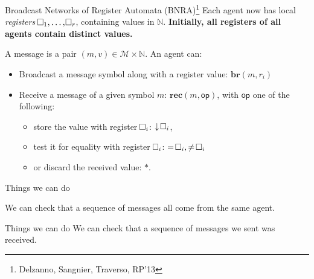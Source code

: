 \documentclass{beamer}
\newcommand{\messages}{\mathcal{M}}
\newcommand{\reg}{\hspace{-0.5mm}\square}
\begin{document}
\begin{frame}{Broadcast Networks of Register Automata (BNRA)\footnote{Delzanno, Sangnier, Traverso, RP'13}}
	Each agent now has local \emph{registers} $\reg_1, \ldots, \reg_r$, containing values in $\mathbb{N}$.
	\pause
	\textbf{Initially, all registers of all agents contain distinct values.}
	
	\pause
	\vspace{0.2cm}
	A message is a pair $(m, v) \in \messages \times \mathbb{N}$.
	An agent can:
	\begin{itemize}
		\item Broadcast a message symbol along with a register value: $\mathbf{br}(m, r_i)$\vspace{0.3cm}\pause
		
		
		\item Receive a message of a given symbol $m$: $\mathbf{rec}(m, \mathsf{op})$, with $\mathsf{op}$ one of the following:
		\begin{itemize}
			\item store the value with register $\reg_i$: $\downarrow \reg_i$,
			
			\item test it for equality with register $\reg_i$: $= \reg_i, \neq \reg_i$
			
			\item or discard the received value: $*$.
		\end{itemize}   
	\end{itemize}
\end{frame}

\begin{frame}{Things we can do}
	
	We can check that a sequence of messages all come from the same agent.
	\vspace{1cm}

	\centering
	
\end{frame}

\begin{frame}{Things we can do}
	We can check that a sequence of messages we sent was received.
	\vspace{1cm}

		\centering
		
\end{frame}
\end{document}
